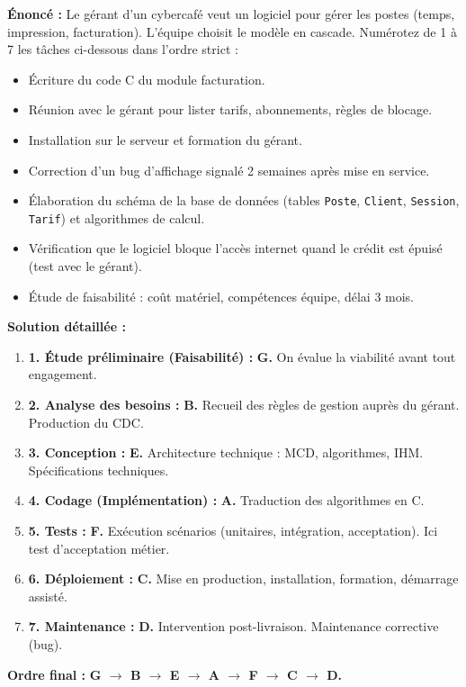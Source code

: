 \documentclass[11pt]{article}
\begin{document}
\begin{exoresolu}
\textbf{Énoncé :} Le gérant d'un cybercafé veut un logiciel pour gérer les postes (temps, impression, facturation). L'équipe choisit le modèle en cascade. Numérotez de 1 à 7 les tâches ci-dessous dans l'ordre strict :
\begin{itemize}
    \item[A.] Écriture du code C du module facturation.
    \item[B.] Réunion avec le gérant pour lister tarifs, abonnements, règles de blocage.
    \item[C.] Installation sur le serveur et formation du gérant.
    \item[D.] Correction d'un bug d'affichage signalé 2 semaines après mise en service.
    \item[E.] Élaboration du schéma de la base de données (tables \texttt{Poste}, \texttt{Client}, \texttt{Session}, \texttt{Tarif}) et algorithmes de calcul.
    \item[F.] Vérification que le logiciel bloque l'accès internet quand le crédit est épuisé (test avec le gérant).
    \item[G.] Étude de faisabilité : coût matériel, compétences équipe, délai 3 mois.
\end{itemize}
\tcblower
\textbf{Solution détaillée :}
\begin{enumerate}
    \item \textbf{1. Étude préliminaire (Faisabilité) :} \textbf{G.} On évalue la viabilité avant tout engagement.
    \item \textbf{2. Analyse des besoins :} \textbf{B.} Recueil des règles de gestion auprès du gérant. Production du CDC.
    \item \textbf{3. Conception :} \textbf{E.} Architecture technique : MCD, algorithmes, IHM. Spécifications techniques.
    \item \textbf{4. Codage (Implémentation) :} \textbf{A.} Traduction des algorithmes en C.
    \item \textbf{5. Tests :} \textbf{F.} Exécution scénarios (unitaires, intégration, acceptation). Ici test d'acceptation métier.
    \item \textbf{6. Déploiement :} \textbf{C.} Mise en production, installation, formation, démarrage assisté.
    \item \textbf{7. Maintenance :} \textbf{D.} Intervention post-livraison. Maintenance corrective (bug).
\end{enumerate}
\textbf{Ordre final :} \textbf{G $\rightarrow$ B $\rightarrow$ E $\rightarrow$ A $\rightarrow$ F $\rightarrow$ C $\rightarrow$ D.}
\end{exoresolu}
\end{document}
